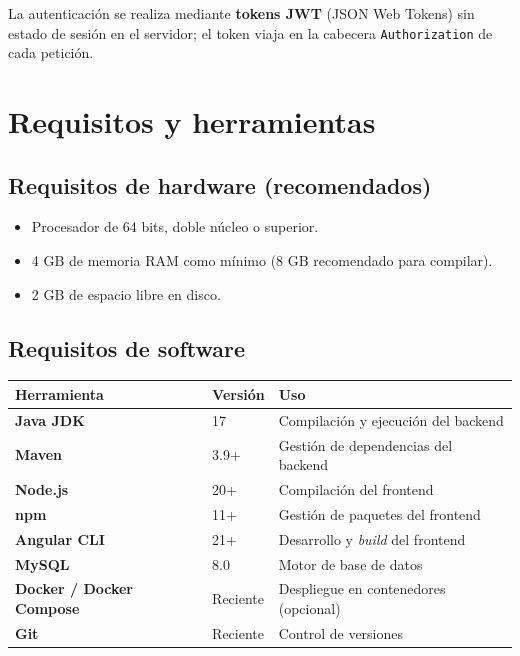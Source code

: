 \documentclass[11pt,a4paper]{article}
\begin{document}
La autenticación se realiza mediante \textbf{tokens JWT} (JSON Web Tokens) sin
estado de sesión en el servidor; el token viaja en la cabecera
\texttt{Authorization} de cada petición.

\section{Requisitos y herramientas}

\subsection{Requisitos de hardware (recomendados)}

\begin{itemize}[noitemsep]
    \item Procesador de 64 bits, doble núcleo o superior.
    \item 4 GB de memoria RAM como mínimo (8 GB recomendado para compilar).
    \item 2 GB de espacio libre en disco.
\end{itemize}

\subsection{Requisitos de software}

\begin{longtable}{>{\bfseries}p{4.5cm} p{4cm} p{5cm}}
\toprule
\textbf{Herramienta} & \textbf{Versión} & \textbf{Uso} \\
\midrule
\endhead
Java JDK & 17 & Compilación y ejecución del backend \\
Maven & 3.9+ & Gestión de dependencias del backend \\
Node.js & 20+ & Compilación del frontend \\
npm & 11+ & Gestión de paquetes del frontend \\
Angular CLI & 21+ & Desarrollo y \emph{build} del frontend \\
MySQL & 8.0 & Motor de base de datos \\
Docker / Docker Compose & Reciente & Despliegue en contenedores (opcional) \\
Git & Reciente & Control de versiones \\
\bottomrule
\end{longtable}
\end{document}
